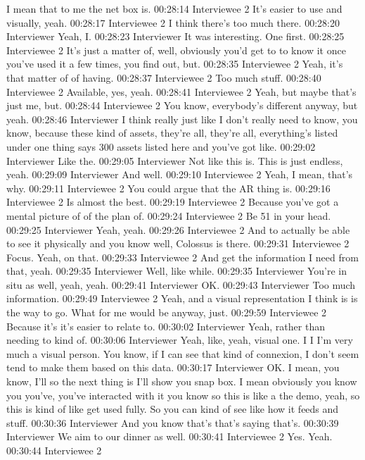 I mean that to me the net box is.
00:28:14 Interviewee 2 
It's easier to use and visually, yeah.
00:28:17 Interviewee 2 
I think there's too much there.
00:28:20 Interviewer
Yeah, I.
00:28:23 Interviewer
It was interesting. One first.
00:28:25 Interviewee 2 
It's just a matter of, well, obviously you'd get to to know it once you've used it a few times, you find out, but.
00:28:35 Interviewee 2 
Yeah, it's that matter of of having.
00:28:37 Interviewee 2 
Too much stuff.
00:28:40 Interviewee 2 
Available, yes, yeah.
00:28:41 Interviewee 2 
Yeah, but maybe that's just me, but.
00:28:44 Interviewee 2 
You know, everybody's different anyway, but yeah.
00:28:46 Interviewer
I think really just like I don't really need to know, you know, because these kind of assets, they're all, they're all, everything's listed under one thing says 300 assets listed here and you've got like.
00:29:02 Interviewer
Like the.
00:29:05 Interviewer
Not like this is. This is just endless, yeah.
00:29:09 Interviewer
And well.
00:29:10 Interviewee 2 
Yeah, I mean, that's why.
00:29:11 Interviewee 2 
You could argue that the AR thing is.
00:29:16 Interviewee 2 
Is almost the best.
00:29:19 Interviewee 2 
Because you've got a mental picture of of the plan of.
00:29:24 Interviewee 2 
Be 51 in your head.
00:29:25 Interviewer
Yeah, yeah.
00:29:26 Interviewee 2 
And to actually be able to see it physically and you know well, Colossus is there.
00:29:31 Interviewee 2 
Focus. Yeah, on that.
00:29:33 Interviewee 2 
And get the information I need from that, yeah.
00:29:35 Interviewer
Well, like while.
00:29:35 Interviewer
You're in situ as well, yeah, yeah.
00:29:41 Interviewer
OK.
00:29:43 Interviewer
Too much information.
00:29:49 Interviewee 2 
Yeah, and a visual representation I think is is the way to go. What for me would be anyway, just.
00:29:59 Interviewee 2 
Because it's it's easier to relate to.
00:30:02 Interviewer
Yeah, rather than needing to kind of.
00:30:06 Interviewer
Yeah, like, yeah, visual one. I I I'm very much a visual person. You know, if I can see that kind of connexion, I don't seem tend to make them based on this data.
00:30:17 Interviewer
OK. I mean, you know, I'll so the next thing is I'll show you snap box. I mean obviously you know you you've, you've interacted with it you know so this is like a the demo, yeah, so this is kind of like get used fully. So you can kind of see like how it feeds and stuff.
00:30:36 Interviewer
And you know that's that's saying that's.
00:30:39 Interviewer
We aim to our dinner as well.
00:30:41 Interviewee 2 
Yes. Yeah.
00:30:44 Interviewee 2 
